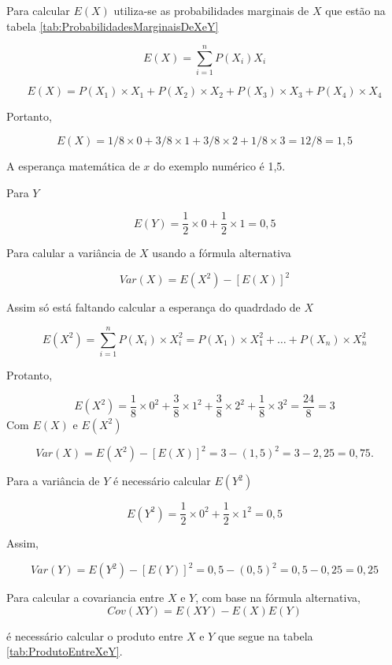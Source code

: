 \documentclass[
]{book}
\begin{document}
Para calcular \(E(X)\) utiliza-se as probabilidades marginais de \(X\) que estão na tabela \ref{tab:ProbabilidadesMarginaisDeXeY}

\[
E(X) = \sum_{i=1}^{n}P(X_i)X_i
\]

\[
E(X) =  P(X_1)\times X_1 + P(X_2)\times X_2 + P(X_3)\times X_3 + P(X_4)\times X_4
\]

Portanto,

\[
E(X) =  1/8\times 0 + 3/8\times 1  + 3/8\times 2 + 1/8\times 3 = 12/8 = 1,5
\]

A esperança matemática de \(x\) do exemplo numérico é 1,5.

Para \(Y\)

\[
  E(Y) = \frac{1}{2}\times 0 + \frac{1}{2} \times 1 = 0,5
\]

Para calular a variância de \(X\) usando a fórmula alternativa

\[
Var(X) = E(X^2) - [E(X)]^2
\]

Assim só está faltando calcular a esperança do quadrdado de \(X\)

\[
E(X^2) = \sum_{i=1}^{n} P(X_i) \times X_i^2 = P(X_1)\times X_1^{2} + \ldots + P(X_n)\times X_{n}^{2}
\]

Protanto,

\[
E(X^2) = \frac{1}{8}\times 0^{2} + \frac{3}{8} \times 1^2 + \frac{3}{8} \times 2^{2} + \frac{1}{8} \times 3^2 = \frac{24}{8} = 3
\]
Com \(E(X)\) e \(E(X^2)\)

\[
  Var(X) = E(X^2) - [E(X)]^2 = 3 - (1,5)^2 = 3 - 2,25 = 0,75.
\]

Para a variância de \(Y\) é necessário calcular \(E(Y^2)\)

\[
  E(Y^2) = \frac{1}{2}\times 0^2 + \frac{1}{2} \times 1^2 = 0,5
\]

Assim,

\[
 Var(Y) = E(Y^2) - [E(Y )]^2 = 0,5 - (0,5)^2 = 0,5 - 0,25 = 0,25
\]

Para calcular a covariancia entre \(X\) e \(Y\), com base na fórmula alternativa,
\[
  Cov(XY) = E(XY) - E(X)E(Y)
\]

é necessário calcular o produto entre \(X\) e \(Y\) que segue na tabela \ref{tab:ProdutoEntreXeY}.
\end{document}
